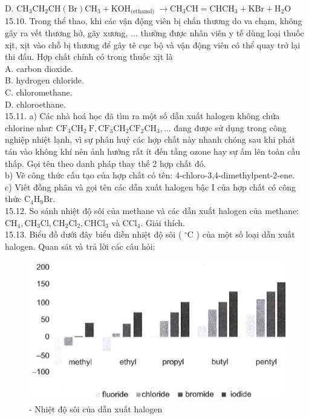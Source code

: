 \documentclass[10pt]{article}
\begin{document}
D. $\mathrm{CH}_{3} \mathrm{CH}_{2} \mathrm{CH}(\mathrm{Br}) \mathrm{CH}_{3}+\mathrm{KOH}_{\text {(ethanol) }} \rightarrow \mathrm{CH}_{3} \mathrm{CH}=\mathrm{CHCH}_{3}+\mathrm{KBr}+\mathrm{H}_{2} \mathrm{O}$\\
15.10. Trong thể thao, khi các vận động viên bị chấn thương do va chạm, không gây ra vết thương hở, gãy xương, ... thường được nhân viên y tế dùng loại thuốc xịt, xịt vào chỗ bị thương để gây tê cục bộ và vận động viên có thể quay trở lại thi đấu. Hợp chất chính có trong thuốc xịt là\\
A. carbon dioxide.\\
B. hydrogen chloride.\\
C. chloromethane.\\
D. chloroethane.\\
15.11. a) Các nhà hoá học đã tìm ra một số dẫn xuất halogen không chứa chlorine như: $\mathrm{CF}_{3} \mathrm{CH}_{2} \mathrm{~F}, \mathrm{CF}_{3} \mathrm{CH}_{2} \mathrm{CF}_{2} \mathrm{CH}_{3}, \ldots$ đang được sử dụng trong công nghiệp nhiệt lạnh, vì sự phân huỷ các hợp chất này nhanh chóng sau khi phát tán vào không khí nên ảnh hưởng rất ít đến tầng ozone hay sự ấm lên toàn cầu thấp. Gọi tên theo danh pháp thay thế 2 hợp chất đó.\\
b) Vẽ công thức cấu tạo của hợp chất có tên: 4-chloro-3,4-dimethylpent-2-ene.\\
c) Viết đồng phân và gọi tên các dẫn xuất halogen bậc I của hợp chất có công thức $\mathrm{C}_{4} \mathrm{H}_{9} \mathrm{Br}$.\\
15.12. So sánh nhiệt độ sôi của methane và các dẫn xuất halogen của methane: $\mathrm{CH}_{4}, \mathrm{CH}_{3} \mathrm{Cl}, \mathrm{CH}_{2} \mathrm{Cl}_{2}, \mathrm{CHCl}_{3}$ và $\mathrm{CCl}_{4}$. Giải thích.\\
15.13. Biểu đồ dưới đây biểu diễn nhiệt độ sôi ( ${ }^{\circ} \mathrm{C}$ ) của một số loại dẫn xuất halogen. Quan sát và trả lời các câu hỏi:

\begin{figure}[h]
\begin{center}
  \includegraphics[width=\textwidth]{2025_10_23_ae7aef68fb3b41082d29g-34}
\captionsetup{labelformat=empty}
\caption{- Nhiệt độ sôi của dẫn xuất halogen}
\end{center}
\end{figure}
\end{document}
